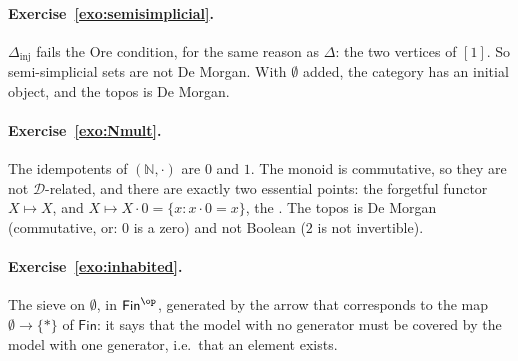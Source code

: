 \paragraph{Exercise~\ref{exo:semisimplicial}.} $\Delta_{\mathrm{inj}}$ fails the Ore condition, for the same reason as $\Delta$: the two vertices of $[1]$. So semi-simplicial sets are not De Morgan. With $\emptyset$ added, the category has an initial object, and the topos is De Morgan.

\paragraph{Exercise~\ref{exo:Nmult}.} The idempotents of $(\mathbb N,\cdot)$ are $0$ and $1$. The monoid is commutative, so they are not $\mathcal D$-related, and there are exactly two essential points: the forgetful functor $X\mapsto X$, and $X\mapsto X\cdot 0 = \{x : x\cdot 0 = x\}$, the . The topos is De Morgan (commutative, or: $0$ is a zero) and not Boolean ($2$ is not invertible).

\paragraph{Exercise~\ref{exo:inhabited}.} The sieve on $\emptyset$, in $\mathsf{Fin}^{\op}$, generated by the arrow that corresponds to the map $\emptyset\to\{\ast\}$ of $\mathsf{Fin}$: it says that the model with no generator must be covered by the model with one generator, i.e.\ that an element exists.
